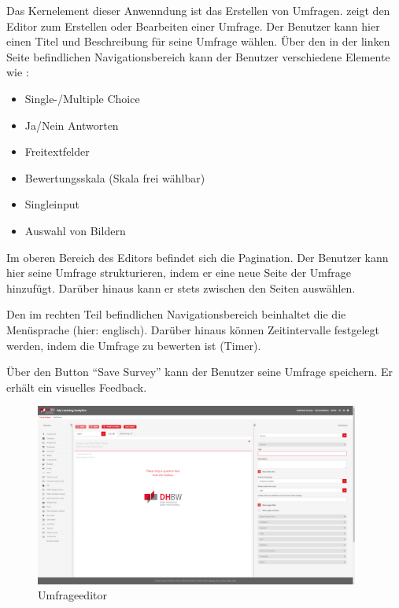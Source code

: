 Das Kernelement dieser Anwenndung ist das Erstellen von Umfragen. 
\abb {} zeigt den Editor zum Erstellen oder Bearbeiten einer Umfrage. \newline
Der Benutzer kann hier einen Titel und Beschreibung für seine Umfrage wählen. 
Über den in der linken Seite befindlichen Navigationsbereich kann der Benutzer verschiedene Elemente wie \ua: 
% 
\begin{itemize}
    \item Single-/Multiple Choice
    \item Ja/Nein Antworten
    \item Freitextfelder
    \item Bewertungsskala (Skala frei wählbar)
    \item Singleinput
    \item Auswahl von Bildern
\end{itemize}
% 

Im oberen Bereich des Editors befindet sich die Pagination. 
Der Benutzer kann hier seine Umfrage strukturieren, indem er eine neue Seite der Umfrage hinzufügt. 
Darüber hinaus kann er stets zwischen den Seiten auswählen. 

Den im rechten Teil befindlichen Navigationsbereich beinhaltet die \ua die Menüsprache (hier: englisch). 
Darüber hinaus können Zeitintervalle festgelegt werden, indem die Umfrage zu bewerten ist (Timer). 

Über den Button \enquote{Save Survey} kann der Benutzer seine Umfrage speichern. 
Er erhält ein visuelles Feedback. 

\begin{figure}[H]
	\centering
	\includegraphics[width=0.95\textwidth, keepaspectratio]{img/guide/SurveyTemplate.png}
	\captionsetup{justification=centering, format=plain}
	\caption[Umfrageeditor]{Umfrageeditor \\\quelleScreenshot}
	\label{fig:Umfrageeditor}
\end{figure}

